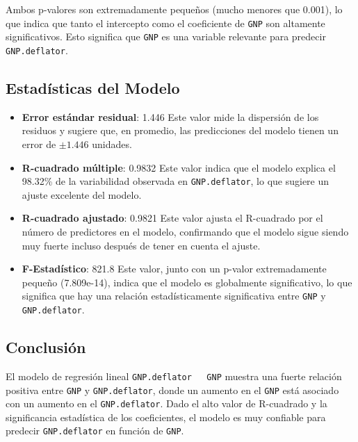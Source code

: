 \documentclass{article}
\begin{document}
Ambos p-valores son extremadamente pequeños (mucho menores que 0.001), lo que indica que tanto el intercepto como el coeficiente de \texttt{GNP} son altamente significativos. Esto significa que \texttt{GNP} es una variable relevante para predecir \texttt{GNP.deflator}.

\subsection*{Estadísticas del Modelo}
\begin{itemize}
    \item \textbf{Error estándar residual}: 1.446  
    Este valor mide la dispersión de los residuos y sugiere que, en promedio, las predicciones del modelo tienen un error de $\pm1.446$ unidades.

    \item \textbf{R-cuadrado múltiple}: 0.9832  
    Este valor indica que el modelo explica el 98.32\% de la variabilidad observada en \texttt{GNP.deflator}, lo que sugiere un ajuste excelente del modelo.

    \item \textbf{R-cuadrado ajustado}: 0.9821  
    Este valor ajusta el R-cuadrado por el número de predictores en el modelo, confirmando que el modelo sigue siendo muy fuerte incluso después de tener en cuenta el ajuste.

    \item \textbf{F-Estadístico}: 821.8  
    Este valor, junto con un p-valor extremadamente pequeño (7.809e-14), indica que el modelo es globalmente significativo, lo que significa que hay una relación estadísticamente significativa entre \texttt{GNP} y \texttt{GNP.deflator}.
\end{itemize}

\subsection*{Conclusión}
El modelo de regresión lineal \texttt{GNP.deflator ~ GNP} muestra una fuerte relación positiva entre \texttt{GNP} y \texttt{GNP.deflator}, donde un aumento en el \texttt{GNP} está asociado con un aumento en el \texttt{GNP.deflator}. Dado el alto valor de R-cuadrado y la significancia estadística de los coeficientes, el modelo es muy confiable para predecir \texttt{GNP.deflator} en función de \texttt{GNP}.
\end{document}
